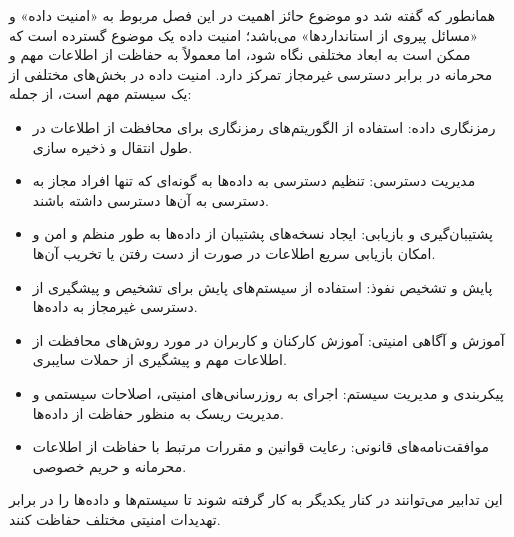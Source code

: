 \documentclass{book}
\begin{document}
        \begin{addinfo2}

            همانطور که گفته شد دو موضوع حائز اهمیت در این فصل مربوط به «امنیت داده» و «مسائل پیروی از استانداردها» می‌باشد؛  امنیت داده یک موضوع گسترده است که ممکن است به ابعاد مختلفی نگاه شود، اما معمولاً به حفاظت از اطلاعات مهم و محرمانه در برابر دسترسی غیرمجاز تمرکز دارد. امنیت داده در بخش‌های مختلفی از یک سیستم مهم است، از جمله:

            \begin{itemize}
                
                \item رمزنگاری داده: استفاده از الگوریتم‌های رمزنگاری برای محافظت از اطلاعات در طول انتقال و ذخیره سازی.

                \item مدیریت دسترسی: تنظیم دسترسی به داده‌ها به گونه‌ای که تنها افراد مجاز به دسترسی به آن‌ها دسترسی داشته باشند.

                \item پشتیبان‌گیری و بازیابی: ایجاد نسخه‌های پشتیبان از داده‌ها به طور منظم و امن و امکان بازیابی سریع اطلاعات در صورت از دست رفتن یا تخریب آن‌ها.

                \item پایش و تشخیص نفوذ: استفاده از سیستم‌های پایش برای تشخیص و پیشگیری از دسترسی غیرمجاز به داده‌ها.

                \item آموزش و آگاهی امنیتی: آموزش کارکنان و کاربران در مورد روش‌های محافظت از اطلاعات مهم و پیشگیری از حملات سایبری.

                \item پیکربندی و مدیریت سیستم: اجرای به روزرسانی‌های امنیتی، اصلاحات سیستمی و مدیریت ریسک به منظور حفاظت از داده‌ها.

                \item موافقت‌نامه‌های قانونی: رعایت قوانین و مقررات مرتبط با حفاظت از اطلاعات محرمانه و حریم خصوصی.

            \end{itemize}

            این تدابیر می‌توانند در کنار یکدیگر به کار گرفته شوند تا سیستم‌ها و داده‌ها را در برابر تهدیدات امنیتی مختلف حفاظت کنند.

        \end{addinfo2}
\end{document}

